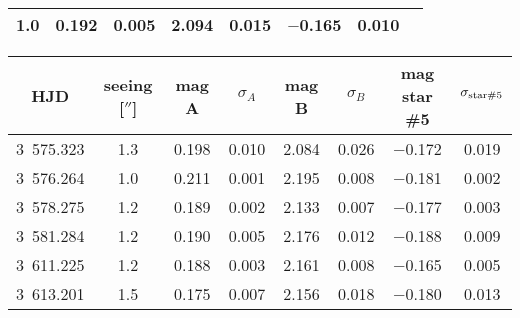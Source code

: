 \begin{table}
\begin{tabular}{cccccccc}
1.0 & 0.192 & 0.005 & 2.094 & 0.015 & $-$0.165 & 0.010 \\  \hline
\end{tabular} 
\end{table} 

\begin{table}%
\begin{tabular}{cccccccc} 
\hline\hline HJD & seeing [$''$] & mag A & $\sigma_A$ & mag B & $\sigma_B$ & mag star \#5 & $\sigma_{\rm star \#5}$ \\ \hline
3~575.323 & 1.3 & 0.198 & 0.010 & 2.084 & 0.026 & $-$0.172 & 0.019 \\ 3~576.264 & 1.0 & 0.211 & 0.001 & 2.195 & 0.008 & $-$0.181 & 0.002\\
3~578.275 & 1.2 & 0.189 & 0.002 & 2.133 & 0.007 & $-$0.177 & 0.003 \\ 3~581.284 & 1.2 & 0.190 & 0.005 & 2.176 & 0.012 & $-$0.188 & 0.009 \\ 3~611.225 & 1.2 & 0.188 & 0.003 & 2.161 & 0.008 & $-$0.165 & 0.005 \\ 3~613.201 & 1.5 & 0.175 & 0.007 & 2.156 & 0.018 & $-$0.180 & 0.013 \\ \hline 
\end{tabular} 
\end{table} 
